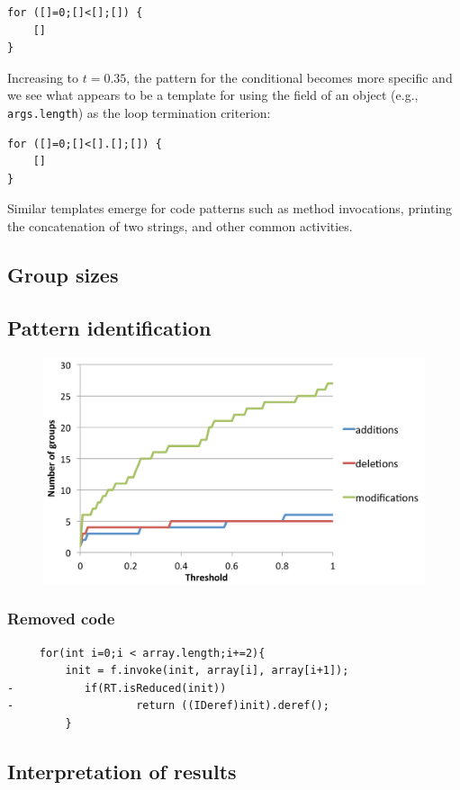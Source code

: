 \begin{verbatim}
for ([]=0;[]<[];[]) {
    []
}
\end{verbatim}

Increasing to $t=0.35$, the pattern for the conditional becomes more specific
and we see what appears to be a template for using the field of an object
(e.g., {\tt args.length}) as the loop termination criterion:

\begin{verbatim}
for ([]=0;[]<[].[];[]) {
    []
}
\end{verbatim}

Similar templates emerge for code patterns such as method invocations, printing
the concatenation of two strings, and other common activities.  

\subsection{Group sizes}

\subsection{Pattern identification}

\begin{figure}
\includegraphics[width=\textwidth*0.2]{figures/clojure-number-of-modifications.pdf}
\end{figure}

\subsubsection{Removed code}
\begin{verbatim}
     for(int i=0;i < array.length;i+=2){
         init = f.invoke(init, array[i], array[i+1]);
-           if(RT.isReduced(init))
-                   return ((IDeref)init).deref();
         }
\end{verbatim}

\subsection{Interpretation of results}

